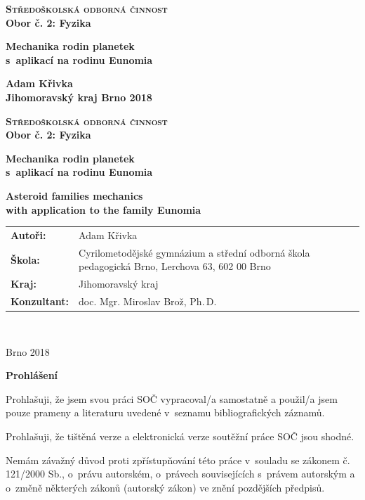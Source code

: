 \documentclass[A4paper, 12pt, oneside]{book}
\newcommand{\B}[1]{\textbf{#1}}
\renewcommand{\S}[1]{\textsc{#1}}
\begin{document}
\begin{center}
	{\fontsize{20pt}{22pt}\selectfont \B{\S{Středoškolská odborná činnost}}} \\
	{\fontsize{16pt}{18pt}\selectfont \B{{Obor č. 2: Fyzika}}}
\end{center}
\vfill
\begin{center}
	{\fontsize{24pt}{26pt}\selectfont \B{Mechanika rodin planetek \\ s~aplikací na rodinu Eunomia}}
\end{center}
\vfill
{\large \bfseries Adam Křivka \\
	Jihomoravský kraj \hfill Brno 2018}
\newpage

\begin{center}
	{\LARGE \B{\S{Středoškolská odborná činnost}}} \\
	{\large \B{{Obor č. 2: Fyzika}}}
\end{center}
\vfill
\begin{center}
	{\Huge \B{Mechanika rodin planetek \\ s~aplikací na rodinu Eunomia}}

	{\Huge \B{Asteroid families mechanics \\ with application to the family Eunomia}}
\end{center}
\vfill
\begin{tabularx}{\textwidth}{lX}
	{\bfseries Autoři:} & Adam Křivka \\
	{\bfseries Škola:} & Cyrilometodějské gymnázium a střední odborná škola pedagogická Brno, Lerchova 63, 602 00 Brno \\
	{\bfseries Kraj:} & Jihomoravský kraj \\
	{\bfseries Konzultant:} & doc. Mgr. Miroslav Brož, Ph.\,D.
\end{tabularx}

\

\noindent Brno 2018

\newpage

{\large \bfseries Prohlášení}

Prohlašuji, že jsem svou práci SOČ vypracoval/a samostatně a použil/a jsem pouze prameny a literaturu uvedené v~seznamu bibliografických záznamů.

Prohlašuji, že tištěná verze a elektronická verze soutěžní práce SOČ jsou shodné. 

Nemám závažný důvod proti zpřístupňování této práce v~souladu se zákonem č. 121/2000 Sb., o~právu autorském, o~právech souvisejících s~právem autorským a o~změně některých zákonů (autorský zákon) ve znění pozdějších předpisů. 
\end{document}
